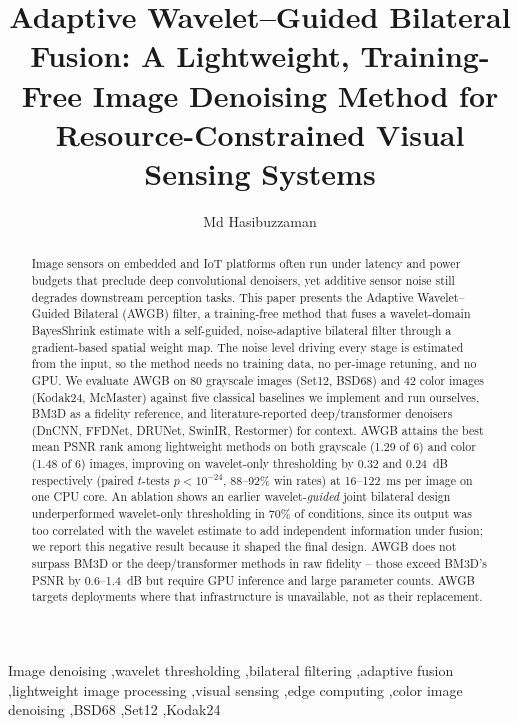 \documentclass[final,3p,times,twocolumn,nopreprintline]{elsarticle}
\begin{document}
\begin{frontmatter}

\title{Adaptive Wavelet--Guided Bilateral Fusion: A Lightweight, Training-Free Image Denoising Method for Resource-Constrained Visual Sensing Systems}

\author[asia]{Md Hasibuzzaman}
\address[asia]{Department of Computer Science and Information Engineering, Asia University, No. 500, Liufeng Road, Wufeng District, Taichung City 413305, Taiwan (R.O.C.)}

\begin{abstract}
Image sensors on embedded and IoT platforms often run under latency and power budgets that preclude deep convolutional denoisers, yet additive sensor noise still degrades downstream perception tasks. This paper presents the Adaptive Wavelet--Guided Bilateral (AWGB) filter, a training-free method that fuses a wavelet-domain BayesShrink estimate with a self-guided, noise-adaptive bilateral filter through a gradient-based spatial weight map. The noise level driving every stage is estimated from the input, so the method needs no training data, no per-image retuning, and no GPU. We evaluate AWGB on 80 grayscale images (Set12, BSD68) and 42 color images (Kodak24, McMaster) against five classical baselines we implement and run ourselves, BM3D as a fidelity reference, and literature-reported deep/transformer denoisers (DnCNN, FFDNet, DRUNet, SwinIR, Restormer) for context. AWGB attains the best mean PSNR rank among lightweight methods on both grayscale (1.29 of 6) and color (1.48 of 6) images, improving on wavelet-only thresholding by 0.32 and 0.24~dB respectively (paired $t$-tests $p<10^{-24}$, 88--92\% win rates) at 16--122~ms per image on one CPU core. An ablation shows an earlier wavelet-\emph{guided} joint bilateral design underperformed wavelet-only thresholding in 70\% of conditions, since its output was too correlated with the wavelet estimate to add independent information under fusion; we report this negative result because it shaped the final design. AWGB does not surpass BM3D or the deep/transformer methods in raw fidelity -- those exceed BM3D's PSNR by 0.6--1.4~dB but require GPU inference and large parameter counts. AWGB targets deployments where that infrastructure is unavailable, not as their replacement.
\end{abstract}

\begin{keyword}
Image denoising \sep wavelet thresholding \sep bilateral filtering \sep adaptive fusion \sep lightweight image processing \sep visual sensing \sep edge computing \sep color image denoising \sep BSD68 \sep Set12 \sep Kodak24
\end{keyword}

\end{frontmatter}
\end{document}
